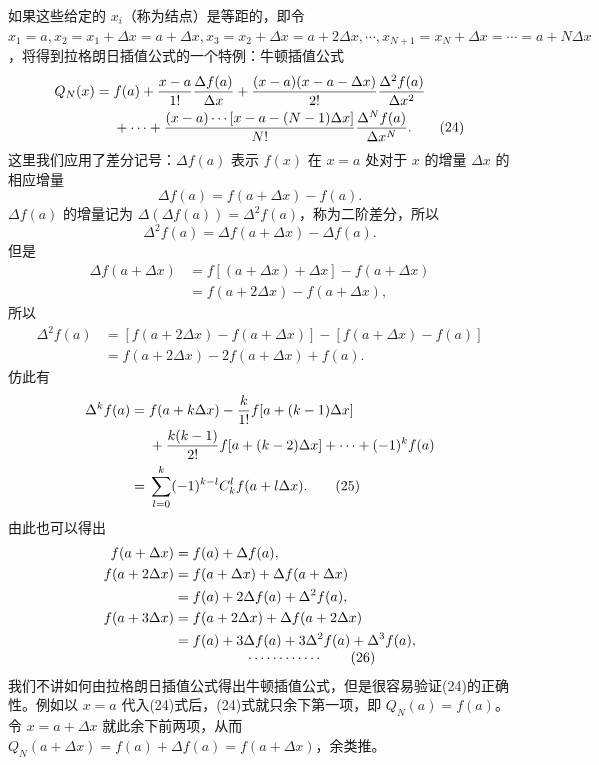 如果这些给定的 $x_i$（称为结点）是等距的，即令 $x_1=a,x_2=x_1+\Delta x=a+\Delta x,x_3=x_2+\Delta x=a+2\Delta x,\cdots,x_{N+1}=x_N+\Delta x=\cdots=a+N\Delta x$，将得到拉格朗日插值公式的一个特例：牛顿插值公式
\begin{align}
 Q_N(x)={}&f(a)+\frac{x-a}{1!}\frac{\Delta f(a)}{\Delta x}
 +\frac{(x-a)(x-a-\Delta x)}{2!}\frac{\Delta^2f(a)}{\Delta x^2}\notag\\
 &+\cdots+\frac{(x-a)\cdots[x-a-(N-1)\Delta x]}{N!}\frac{\Delta^Nf(a)}{\Delta x^N}.
 \tag{24}
\end{align}
这里我们应用了差分记号：$\Delta f(a)$ 表示 $f(x)$ 在 $x=a$ 处对于 $x$ 的增量 $\Delta x$ 的相应增量
\[
 \Delta f(a)=f(a+\Delta x)-f(a).
\]
$\Delta f(a)$ 的增量记为 $\Delta(\Delta f(a))=\Delta^2f(a)$，称为二阶差分，所以
\[
 \Delta^2f(a)=\Delta f(a+\Delta x)-\Delta f(a).
\]
但是
\begin{align*}
 \Delta f(a+\Delta x)&=f[(a+\Delta x)+\Delta x]-f(a+\Delta x)\\
 &=f(a+2\Delta x)-f(a+\Delta x),
\end{align*}
所以
\begin{align*}
 \Delta^2f(a)
 &=[f(a+2\Delta x)-f(a+\Delta x)]-[f(a+\Delta x)-f(a)]\\
 &=f(a+2\Delta x)-2f(a+\Delta x)+f(a).
\end{align*}
仿此有
\begin{align}
 \Delta^kf(a)={}&f(a+k\Delta x)-\frac{k}{1!}f[a+(k-1)\Delta x]\notag\\
 &+\frac{k(k-1)}{2!}f[a+(k-2)\Delta x]+\cdots+(-1)^kf(a)\notag\\
 ={}&\sum_{l=0}^k(-1)^{k-l}C_k^l f(a+l\Delta x).
 \tag{25}
\end{align}
由此也可以得出
\begin{align*}
 f(a+\Delta x)&=f(a)+\Delta f(a),\\
 f(a+2\Delta x)&=f(a+\Delta x)+\Delta f(a+\Delta x)\\
 &=f(a)+2\Delta f(a)+\Delta^2f(a),\\
 f(a+3\Delta x)&=f(a+2\Delta x)+\Delta f(a+2\Delta x)\\
 &=f(a)+3\Delta f(a)+3\Delta^2f(a)+\Delta^3f(a),\\[-1mm]
 &\hspace{18mm}\cdots\cdots\cdots\cdots
 \tag{26}
\end{align*}
我们不讲如何由拉格朗日插值公式得出牛顿插值公式，但是很容易验证(24)的正确性。例如以 $x=a$ 代入(24)式后，(24)式就只余下第一项，即 $Q_N(a)=f(a)$。令 $x=a+\Delta x$ 就此余下前两项，从而 $Q_N(a+\Delta x)=f(a)+\Delta f(a)=f(a+\Delta x)$，余类推。

